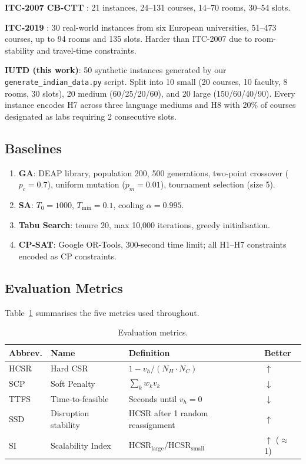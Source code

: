 \documentclass[conference]{IEEEtran}
\begin{document}
\textbf{ITC-2007 CB-CTT} \cite{digaspero2007}: 21 instances, 24--131 courses, 14--70 rooms, 30--54 slots.

\textbf{ITC-2019} \cite{muller2018}: 30 real-world instances from six European universities, 51--473 courses, up to 94 rooms and 135 slots. Harder than ITC-2007 due to room-stability and travel-time constraints.

\textbf{IUTD (this work)}: 50 synthetic instances generated by our \texttt{generate\_indian\_data.py} script. Split into 10 small (20 courses, 10 faculty, 8 rooms, 30 slots), 20 medium (60/25/20/60), and 20 large (150/60/40/90). Every instance encodes H7 across three language mediums and H8 with 20\% of courses designated as labs requiring 2 consecutive slots.

\subsection{Baselines}

\begin{enumerate}
  \item \textbf{GA}: DEAP library, population 200, 500 generations, two-point crossover ($p_c=0.7$), uniform mutation ($p_m=0.01$), tournament selection (size 5).
  \item \textbf{SA}: $T_0=1000$, $T_\text{min}=0.1$, cooling $\alpha=0.995$.
  \item \textbf{Tabu Search}: tenure 20, max 10,000 iterations, greedy initialisation.
  \item \textbf{CP-SAT}: Google OR-Tools, 300-second time limit; all H1--H7 constraints encoded as CP constraints.
\end{enumerate}

\subsection{Evaluation Metrics}

Table~\ref{tab:metrics} summarises the five metrics used throughout.

\begin{table}[ht]
\centering
\caption{Evaluation metrics.}
\label{tab:metrics}
\begin{tabularx}{\linewidth}{llXl}
\toprule
\textbf{Abbrev.} & \textbf{Name} & \textbf{Definition} & \textbf{Better} \\
\midrule
HCSR & Hard CSR & $1 - v_h / (N_H \cdot N_C)$ & $\uparrow$ \\
SCP  & Soft Penalty & $\sum_k w_k v_k$ & $\downarrow$ \\
TTFS & Time-to-feasible & Seconds until $v_h=0$ & $\downarrow$ \\
SSD  & Disruption stability & HCSR after 1 random reassignment & $\uparrow$ \\
SI   & Scalability Index & $\text{HCSR}_\text{large}/\text{HCSR}_\text{small}$ & $\uparrow$ ($\approx$1) \\
\bottomrule
\end{tabularx}
\end{table}
\end{document}
